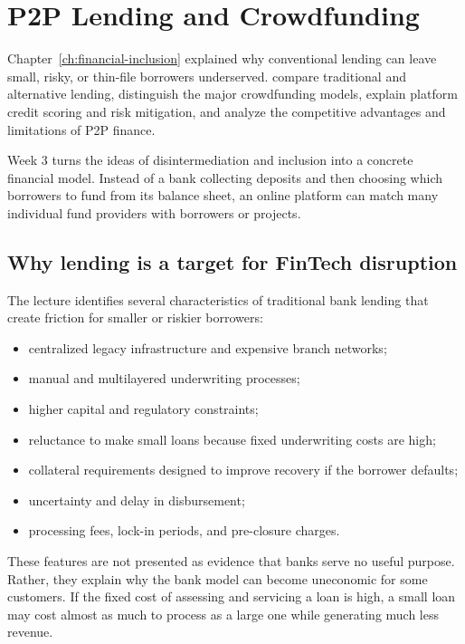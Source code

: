 \chapter{P2P Lending and Crowdfunding}
\label{ch:p2p-crowdfunding}

\chapterguide%
  {Chapter~\ref{ch:financial-inclusion} explained why conventional lending can leave small, risky, or thin-file borrowers underserved.}
  {compare traditional and alternative lending, distinguish the major crowdfunding models, explain platform credit scoring and risk mitigation, and analyze the competitive advantages and limitations of P2P finance.}

Week 3 turns the ideas of disintermediation and inclusion into a concrete financial model. Instead of a bank collecting deposits and then choosing which borrowers to fund from its balance sheet, an online platform can match many individual fund providers with borrowers or projects.

\section{Why lending is a target for FinTech disruption}

The lecture identifies several characteristics of traditional bank lending that create friction for smaller or riskier borrowers:

\begin{itemize}
  \item centralized legacy infrastructure and expensive branch networks;
  \item manual and multilayered underwriting processes;
  \item higher capital and regulatory constraints;
  \item reluctance to make small loans because fixed underwriting costs are high;
  \item collateral requirements designed to improve recovery if the borrower defaults;
  \item uncertainty and delay in disbursement;
  \item processing fees, lock-in periods, and pre-closure charges.
\end{itemize}

These features are not presented as evidence that banks serve no useful purpose. Rather, they explain why the bank model can become uneconomic for some customers. If the fixed cost of assessing and servicing a loan is high, a small loan may cost almost as much to process as a large one while generating much less revenue.

